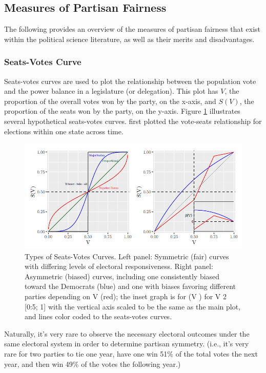\subsection{Measures of Partisan Fairness}

The following provides an overview of the measures of partisan fairness that exist within the political science literature, as well as their merits and disadvantages. 

\subsubsection{Seats-Votes Curve}

Seats-votes curves are used to plot the relationship between the population vote and the power balance in a legislature (or delegation). This plot has $V$, the proportion of the overall votes won by the party, on the x-axis, and $S(V)$, the proportion of the seats won by the party, on the y-axis. Figure \ref{fig:seatsvotes1} illustrates several hypothetical seats-votes curves. \textcite{tufte1973} first plotted the vote-seats relationship for elections within one state across time. 

\begin{figure}
    \centering
    \includegraphics[width=0.8\linewidth]{img/seatsvotes.png}
    \caption{Types of Seats-Votes Curves. Left panel: Symmetric (fair) curves with differing
    levels of electoral responsiveness. Right panel: Asymmetric (biased) curves, including
    one consistently biased toward the Democrats (blue) and one with biases favoring different parties depending on V (red); the inset graph is for (V ) for V 2 [0:5; 1] with the vertical axis scaled to be the same as the main plot, and lines color coded to the seats-votes curves. \parencite[175]{katz2020}}
    \label{fig:seatsvotes1}
\end{figure}

Naturally, it's very rare to observe the necessary electoral outcomes under the same electoral system in order to determine partisan symmetry. (i.e., it's very rare for two parties to tie one year, have one win 51\% of the total votes the next year, and then win 49\% of the votes the following year.)

